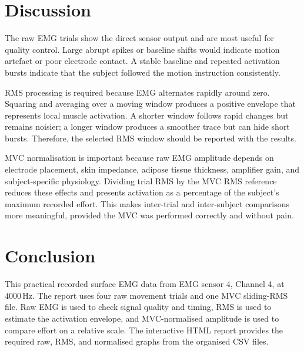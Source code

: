 \documentclass[12pt,a4paper]{article}
\begin{document}
\section{Discussion}
The raw EMG trials show the direct sensor output and are most useful for
quality control. Large abrupt spikes or baseline shifts would indicate motion
artefact or poor electrode contact. A stable baseline and repeated activation
bursts indicate that the subject followed the motion instruction consistently.

RMS processing is required because EMG alternates rapidly around zero. Squaring
and averaging over a moving window produces a positive envelope that represents
local muscle activation. A shorter window follows rapid changes but remains
noisier; a longer window produces a smoother trace but can hide short bursts.
Therefore, the selected RMS window should be reported with the results.

MVC normalisation is important because raw EMG amplitude depends on electrode
placement, skin impedance, adipose tissue thickness, amplifier gain, and
subject-specific physiology. Dividing trial RMS by the MVC RMS reference
reduces these effects and presents activation as a percentage of the subject's
maximum recorded effort. This makes inter-trial and inter-subject comparisons
more meaningful, provided the MVC was performed correctly and without pain.

\section{Conclusion}
This practical recorded surface EMG data from EMG sensor 4, Channel 4, at
$4000\,\mathrm{Hz}$. The report uses four raw movement trials and one MVC
sliding-RMS file. Raw EMG is used to check signal quality and timing, RMS is
used to estimate the activation envelope, and MVC-normalised amplitude is used
to compare effort on a relative scale. The interactive HTML report provides the
required raw, RMS, and normalised graphs from the organised CSV files.
\end{document}
